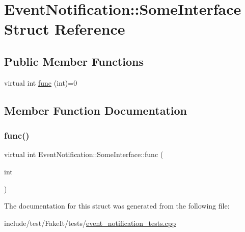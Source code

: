 \hypertarget{structEventNotification_1_1SomeInterface}{}\section{Event\+Notification\+::Some\+Interface Struct Reference}
\label{structEventNotification_1_1SomeInterface}
\subsection*{Public Member Functions}
\begin{DoxyCompactItemize}
\item 
virtual int \mbox{\hyperlink{structEventNotification_1_1SomeInterface_a2aead7f3f09365aa715cd190d3299015}{func}} (int)=0
\end{DoxyCompactItemize}


\subsection{Member Function Documentation}
\mbox{\label{structEventNotification_1_1SomeInterface_a2aead7f3f09365aa715cd190d3299015}} 
\subsubsection{\texorpdfstring{func()}{func()}}
{\footnotesize\ttfamily virtual int Event\+Notification\+::\+Some\+Interface\+::func (\begin{DoxyParamCaption}\item[{int}]{ }\end{DoxyParamCaption})\hspace{0.3cm}{\ttfamily [pure virtual]}}



The documentation for this struct was generated from the following file\+:\begin{DoxyCompactItemize}
\item 
include/test/\+Fake\+It/tests/\mbox{\hyperlink{event__notification__tests_8cpp}{event\+\_\+notification\+\_\+tests.\+cpp}}\end{DoxyCompactItemize}
